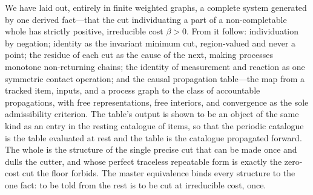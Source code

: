 \documentclass[11pt,a4paper]{article}
\theoremstyle{thmstyle}
\theoremstyle{definition}
\theoremstyle{remark}
\newcommand{\flo}{\beta}                 %
\begin{document}
We have laid out, entirely in finite weighted graphs, a complete system
generated by one derived fact---that the cut individuating a part of a
non-completable whole has strictly positive, irreducible cost $\flo>0$.
From it follow: individuation by negation; identity as the invariant
minimum cut, region-valued and never a point; the residue of each cut as
the cause of the next, making processes monotone non-returning chains; the
identity of measurement and reaction as one symmetric contact operation;
and the causal propagation table---the map from a tracked item, inputs, and
a process graph to the class of accountable propagations, with free
representations, free interiors, and convergence as the sole admissibility
criterion. The table's output is shown to be an object of the same kind as
an entry in the resting catalogue of items, so that the periodic catalogue
is the table evaluated at rest and the table is the catalogue propagated
forward. The whole is the structure of the single precise cut that can be
made once and dulls the cutter, and whose perfect traceless repeatable form
is exactly the zero-cost cut the floor forbids. The master equivalence
binds every structure to the one fact: to be told from the rest is to be
cut at irreducible cost, once.



\end{document}
